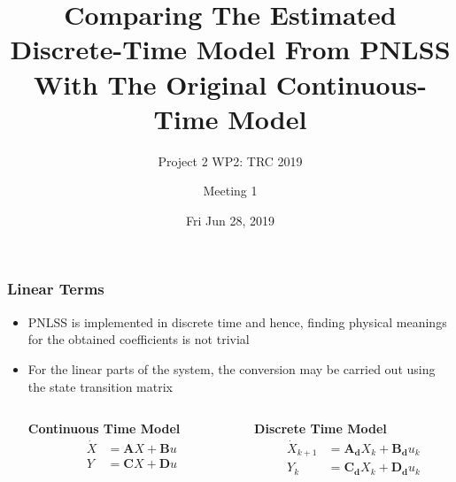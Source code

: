 \documentclass[aspectratio=169]{beamer}
\title{Comparing The Estimated Discrete-Time Model From PNLSS With The
  Original Continuous-Time Model}
\subtitle{Project 2 WP2: TRC 2019}
\author{Meeting 1}
\date{Fri Jun 28, 2019}
\begin{document}
\maketitle{}

\begin{frame}[allowframebreaks]
  \frametitle{Linear Terms}
  \begin{itemize}
  \item PNLSS is implemented in discrete time and hence, finding
    physical meanings for the obtained coefficients is not trivial
  \item For the linear parts of the system, the conversion may be
    carried out using the state transition matrix\\
    
    \begin{columns}
      \begin{column}{0.5\linewidth}
        \centering
        \textbf{Continuous Time Model}
        \begin{align*}
          \dot{X} &= \mathbf{A}X + \mathbf{B}u\\
          Y &= \mathbf{C}X + \mathbf{D}u
        \end{align*}
      \end{column}
      \begin{column}{0.5\linewidth}
        \centering
        \textbf{Discrete Time Model}
        \begin{align*}
          \dot{X}_{k+1} &= \mathbf{A_d}X_k + \mathbf{B_d}u_k\\
          Y_k &= \mathbf{C_d}X_k + \mathbf{D_d}u_k
        \end{align*}
      \end{column}    
    \end{columns}
    

\end{itemize}
\end{frame}
\end{document}
